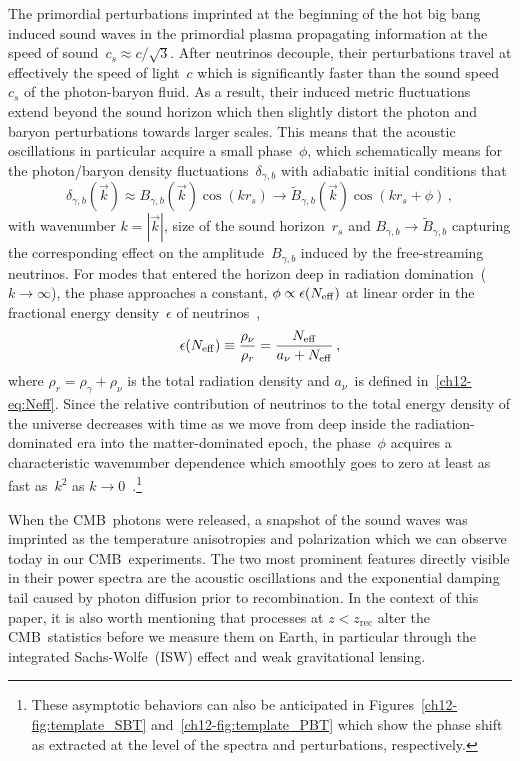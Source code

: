The primordial perturbations imprinted at the beginning of the hot big bang induced sound waves in the primordial plasma propagating information at the speed of sound~$c_s \approx c/\sqrt{3}$. After neutrinos decouple, their perturbations travel at effectively the speed of light~$c$ which is significantly faster than the sound speed~$c_s$ of the photon-baryon fluid. As a result, their induced metric fluctuations extend beyond the sound horizon which then slightly distort the photon and baryon perturbations towards larger scales. This means that the acoustic oscillations in particular acquire a small phase~$\phi$, which schematically means for the photon/baryon density fluctuations~$\delta_{\gamma,b}$ with adiabatic initial conditions that
\begin{equation}
	\delta_{\gamma,b}(\vec{k}) \approx B_{\gamma,b}(\vec{k}) \cos(k r_s) \to \tilde{B}_{\gamma,b}(\vec{k}) \cos(k r_s + \phi)\, ,
\end{equation}
with wavenumber $k = |\vec{k}|$, size of the sound horizon~$r_s$ and $B_{\gamma,b} \to \tilde{B}_{\gamma,b}$ capturing the corresponding effect on the amplitude~$B_{\gamma,b}$ induced by the free-streaming neutrinos. For modes that entered the horizon deep in radiation domination~($k \to \infty$), the phase approaches a constant, $\phi \propto \epsilon(N_\mathrm{eff})$ at linear order in the fractional energy density~$\epsilon$ of neutrinos~\cite{Bashinsky:2003tk, Baumann:2015rya},
\begin{equation}
	\epsilon(N_\mathrm{eff}) \equiv \frac{\rho_\nu}{\rho_r} = \frac{N_\mathrm{eff}}{a_\nu + N_\mathrm{eff}} \, ,	\label{ch12-eq:fractional_density}
\end{equation}
where $\rho_r = \rho_\gamma + \rho_\nu$ is the total radiation density and $a_\nu$~is defined in~\eqref{ch12-eq:Neff}. Since the relative contribution of neutrinos to the total energy density of the universe decreases with time as we move from deep inside the radiation-dominated era into the matter-dominated epoch, the phase~$\phi$ acquires a characteristic wavenumber dependence which smoothly goes to zero at least as fast as~$k^2$ as $k \to 0$~\cite{Baumann:2015rya}.\footnote{These asymptotic behaviors can also be anticipated in Figures~\ref{ch12-fig:template_SBT} and~\ref{ch12-fig:template_PBT} which show the phase shift as extracted at the level of the spectra and perturbations, respectively.}\medskip

When the CMB~photons were released, a snapshot of the sound waves was imprinted as the temperature anisotropies and polarization which we can observe today in our CMB~experiments. The two most prominent features directly visible in their power spectra are the acoustic oscillations and the exponential damping tail caused by photon diffusion prior to recombination. In the context of this paper, it is also worth mentioning that processes at $z < z_\mathrm{rec}$ alter the CMB~statistics before we measure them on Earth, in particular through the integrated Sachs-Wolfe~(ISW) effect and weak gravitational lensing.

